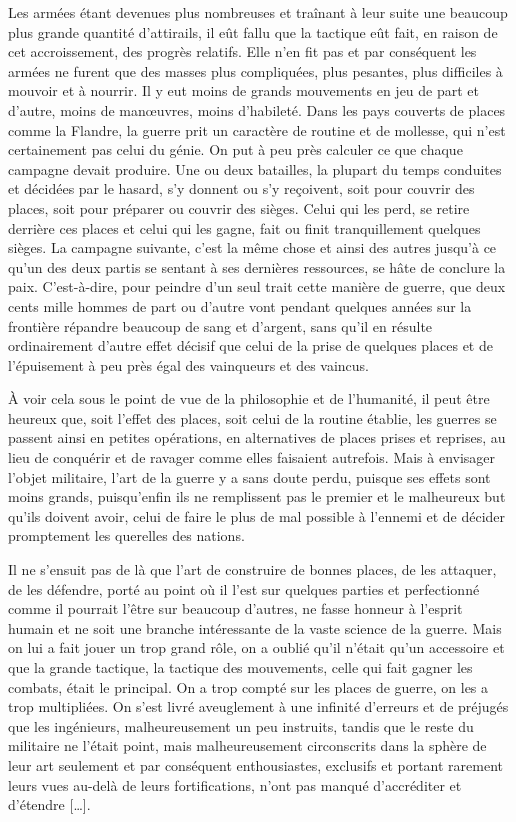 \documentclass[french,twoside]{book} %
\begin{document}
Les armées étant devenues plus nombreuses et traînant à leur suite une beaucoup plus grande quantité d’attirails, il eût fallu que la tactique eût fait, en raison de cet accroissement, des progrès relatifs. Elle n’en fit pas et par conséquent les armées ne furent que des masses plus compliquées, plus pesantes, plus difficiles à mouvoir et à nourrir. Il y eut moins de grands mouvements en jeu de part et d’autre, moins de manœuvres, moins d’habileté. Dans les pays couverts de places comme la Flandre, la guerre prit un caractère de routine et de mollesse, qui n’est certainement pas celui du génie. On put à peu près calculer ce que chaque campagne devait produire. Une ou deux batailles, la plupart du temps conduites et décidées par le hasard, s’y donnent ou s’y reçoivent, soit pour couvrir des places, soit pour préparer ou couvrir des sièges. Celui qui les perd, se retire derrière ces places et celui qui les gagne, fait ou finit tranquillement quelques sièges. La campagne suivante, c’est la même chose et ainsi des autres jusqu’à ce qu’un des deux partis se sentant à ses dernières ressources, se hâte de conclure la paix. C’est-à-dire, pour peindre d’un seul trait cette manière de guerre, que deux cents mille hommes de part ou d’autre vont pendant quelques années sur la frontière répandre beaucoup de sang et d’argent, sans qu’il en résulte ordinairement d’autre effet décisif que celui de la prise de quelques places et de l’épuisement à peu près égal des vainqueurs et des vaincus.\par
À voir cela sous le point de vue de la philosophie et de l’humanité, il peut être heureux que, soit l’effet des places, soit celui de la routine établie, les guerres se passent ainsi en petites opérations, en alternatives de places prises et reprises, au lieu de conquérir et de ravager comme elles faisaient autrefois. Mais à envisager l’objet militaire, l’art de la guerre y a sans doute perdu, puisque ses effets sont moins grands, puisqu’enfin ils ne remplissent pas le premier et le malheureux but qu’ils doivent avoir, celui de faire le plus de mal possible à l’ennemi et de décider promptement les querelles des nations.\par
Il ne s’ensuit pas de là que l’art de construire de bonnes places, de les attaquer, de les défendre, porté au point où il l’est sur quelques parties et perfectionné comme il pourrait l’être sur beaucoup d’autres, ne fasse honneur à l’esprit humain et ne soit une branche intéressante de la vaste science de la guerre. Mais on lui a fait jouer un trop grand rôle, on a oublié qu’il n’était qu’un accessoire et que la grande tactique, la tactique des mouvements, celle qui fait gagner les combats, était le principal. On a trop compté sur les places de guerre, on les a trop multipliées. On s’est livré aveuglement à une infinité d’erreurs et de préjugés que les ingénieurs, malheureusement un peu instruits, tandis que le reste du militaire ne l’était point, mais malheureusement circonscrits dans la sphère de leur art seulement et par conséquent enthousiastes, exclusifs et portant rarement leurs vues au-delà de leurs fortifications, n’ont pas manqué d’accréditer et d’étendre […].\par
\end{document}
